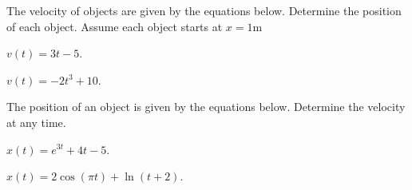 
\begin{problem}
\item The velocity of objects are given by the equations
  below. Determine the position of each object. Assume each object
  starts at $x=1$m
  \begin{subproblem}
  \item $v(t) = 3t - 5$.
    \vfill
  \item $v(t) = -2 t^3 + 10$.
    \vfill
  \end{subproblem}
\item The position of an object is given by the equations
  below. Determine the velocity at any time.
  \begin{subproblem}
  \item $x(t) = e^{3t} + 4t  - 5$.
    \vfill
  \item $x(t) = 2\cos(\pi t) + \ln(t+2)$.
    \vfill
  \end{subproblem}
\end{problem}


